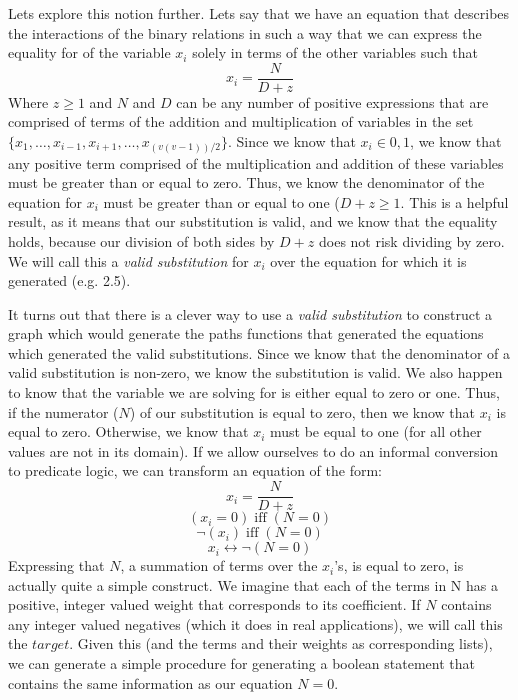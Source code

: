 \documentclass[a4paper,12pt]{article}
\begin{document}
Lets explore this notion further.  Lets say that we have an equation that describes the interactions of the binary relations in such a way that we can express the equality for of the variable \(x_i\) solely in terms of the other variables such that \[x_i = \frac{N}{D + z}\] Where \(z \geq 1\) and \(N\) and \(D\) can be any number of positive expressions that are comprised of terms of the addition and multiplication of variables in the set \(\{x_1, \dots,  x_{i-1},x_{i+1}, \dots, x_{(v(v-1))/2}\}\).  Since we know that \(x_i \in {0,1}\), we know that any positive term comprised of the multiplication and addition of these variables must be greater than or equal to zero.  Thus, we know the denominator of the equation for \(x_i\) must be greater than or equal to one (\(D + z \geq 1\). This is a helpful result, as it means that our substitution is valid, and we know that the equality holds, because our division of both sides by \(D + z\) does not risk dividing by zero.  We will call this a \emph{valid substitution} for \(x_i\) over the equation for which it is generated (e.g. 2.5). 

It turns out that there is a clever way to use a \emph{valid substitution} to construct a graph which would generate the paths functions that generated the equations which generated the valid substitutions.  Since we know that the denominator of a valid substitution is non-zero, we know the substitution is valid.  We also happen to know that the variable we are solving for is either equal to zero or one.  Thus, if the numerator (\(N\)) of our substitution is equal to zero, then we know that \(x_i\) is equal to zero.  Otherwise, we know that \(x_i\) must be equal to one (for all other values are not in its domain). If we allow ourselves to do an informal conversion to predicate logic, we can transform an equation of the form:
 \[x_i = \frac{N}{D + z}\] 
 \[(x_i = 0) \; \text{iff} \; (N = 0)\]
 \[\neg(x_i) \; \text{iff} \; (N = 0)\]
 \[x_i  \leftrightarrow  \neg(N = 0)\]
 Expressing that \(N\), a summation of terms over the \(x_i\)'s, is equal to zero, is actually quite a simple construct. We imagine that each of the terms in N has a positive, integer valued weight that corresponds to its coefficient. If \(N\) contains any integer valued negatives (which it does in real applications), we will call this the \(target\).  Given this (and the terms and their weights as corresponding lists), we can generate a simple procedure for generating a boolean statement that contains the same information as our equation \(N = 0\).
\end{document}
